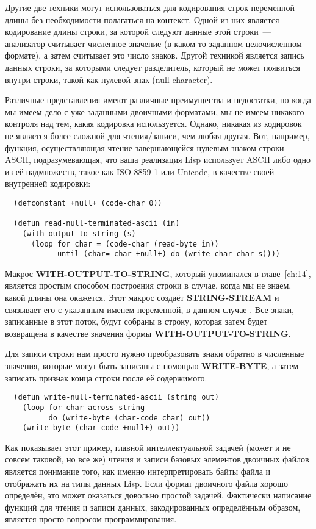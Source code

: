 Другие две техники могут использоваться для кодирования строк переменной длины без
необходимости полагаться на контекст. Одной из них является кодирование длины строки, за
которой следуют данные этой строки~--- анализатор считывает численное значение (в каком-то
заданном целочисленном формате), а затем считывает это число знаков. Другой техникой
является запись данных строки, за которыми следует разделитель, который не может появиться
внутри строки, такой как нулевой знак (null character).

Различные представления имеют различные преимущества и недостатки, но когда мы имеем дело
с уже заданными двоичными форматами, мы не имеем никакого контроля над тем, какая
кодировка используется. Однако, никакая из кодировок не является более сложной для
чтения/записи, чем любая другая. Вот, например, функция, осуществляющая чтение
завершающейся нулевым знаком строки ASCII, подразумевающая, что ваша реализация Lisp
использует ASCII либо одно из её надмножеств, такое как ISO-8859-1 или Unicode, в качестве
своей внутренней кодировки:

\begin{lstlisting}
  (defconstant +null+ (code-char 0))

  (defun read-null-terminated-ascii (in)
    (with-output-to-string (s)
      (loop for char = (code-char (read-byte in))
            until (char= char +null+) do (write-char char s))))
\end{lstlisting}

Макрос \textbf{WITH-OUTPUT-TO-STRING}, который упоминался в главе~\ref{ch:14}, является
простым способом построения строки в случае, когда мы не знаем, какой длины она
окажется. Этот макрос создаёт \textbf{STRING-STREAM} и связывает его с указанным именем
переменной, в данном случае . Все знаки, записанные в этот поток, будут собраны в
строку, которая затем будет возвращена в качестве значения формы
\textbf{WITH-OUTPUT-TO-STRING}.

Для записи строки нам просто нужно преобразовать знаки обратно в численные значения,
которые могут быть записаны с помощью \textbf{WRITE-BYTE}, а затем записать признак конца
строки после её содержимого.

\begin{lstlisting}
  (defun write-null-terminated-ascii (string out)
    (loop for char across string
          do (write-byte (char-code char) out))
    (write-byte (char-code +null+) out))
\end{lstlisting}

Как показывает этот пример, главной интеллектуальной задачей (может и не совсем таковой,
но все же) чтения и записи базовых элементов двоичных файлов является понимание того, как
именно интерпретировать байты файла и отображать их на типы данных Lisp. Если формат
двоичного файла хорошо определён, это может оказаться довольно простой задачей. Фактически
написание функций для чтения и записи данных, закодированных определённым образом,
является просто вопросом программирования.

